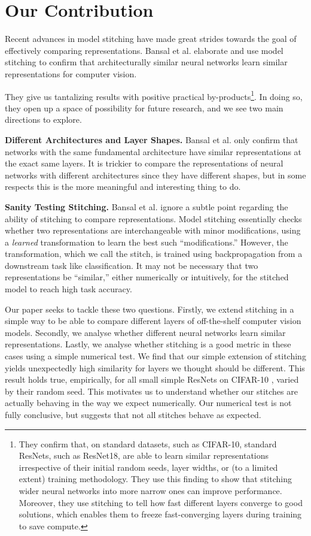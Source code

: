 \documentclass{article} %
\begin{document}
\section{Our Contribution}
\label{Contribution}
Recent advances in model stitching \cite{Bansal2021RevisitingMS} have made great strides towards the goal of effectively
comparing representations. Bansal et al. elaborate and use model stitching to confirm that architecturally similar
neural networks learn similar representations for computer vision.

They give us tantalizing results with positive practical by-products\footnote{
   They confirm that, on standard datasets, such as CIFAR-10, standard ResNets, such as ResNet18, are able to learn similar
   representations irrespective of their initial random seeds, layer widths, or (to a limited extent) training methodology.
   They use this finding to show that stitching wider neural networks into more narrow ones can improve performance. Moreover,
   they use stitching to tell how fast different layers converge to good solutions, which enables them to freeze
   fast-converging layers during training to save compute.
}.
In doing so, they open up a space of possibility for future research, and we see two main directions to explore.

\textbf{Different Architectures and Layer Shapes.} Bansal et al. only confirm that networks with the same 
fundamental architecture have similar representations at
the exact same layers. It is trickier to compare the representations of neural networks with different architectures
since they have different shapes, but in some respects this is the more meaningful and interesting thing to do.

\textbf{Sanity Testing Stitching.} Bansal et al. ignore a subtle point regarding the ability 
of stitching to compare representations. Model stitching essentially checks whether two representations
are interchangeable with minor modifications, using a \textit{learned} transformation to learn the best
such ``modifications.'' However, the transformation, which we call the stitch, is trained using backpropagation
from a downstream task like classification. It may not be necessary that two representations be ``similar,'' either
numerically or intuitively, for the stitched model to reach high task accuracy.

Our paper seeks to tackle these two questions. Firstly, we extend stitching in a simple way to be able to compare
different layers of off-the-shelf computer vision models. Secondly, we analyse 
whether different neural networks learn similar
representations. Lastly, we analyse whether stitching is a good metric in these cases using a simple numerical test. We
find that our simple extension of stitching yields unexpectedly high similarity for layers we thought should be different.
This result holds true, empirically, for all small simple ResNets \cite{He2016DeepRL} on CIFAR-10 \cite{CIFAR10},
varied by their random seed. This motivates
us to understand whether our stitches are actually behaving in the way we expect numerically. Our numerical test is not
fully conclusive, but suggests that not all stitches behave as expected.
\end{document}
